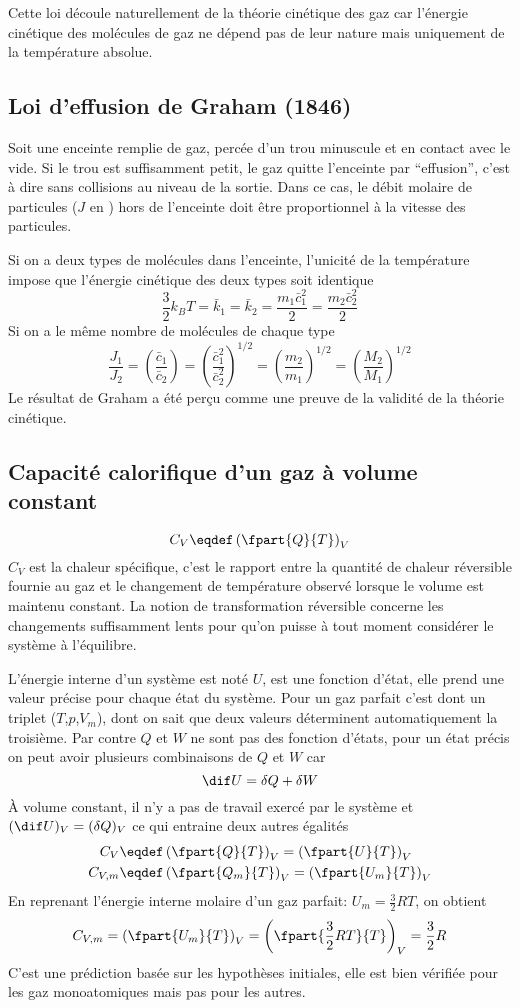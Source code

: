 Cette loi découle naturellement de la théorie cinétique des gaz car
l'énergie cinétique des molécules de gaz ne dépend pas de leur nature mais
uniquement de la température absolue.

\subsection{Loi d'effusion de Graham (1846)}
Soit une enceinte remplie de gaz, percée d'un trou minuscule et
en contact avec le vide.
Si le trou est suffisamment petit,
le gaz quitte l'enceinte par ``effusion'',
c'est à dire sans collisions au niveau de la sortie.
Dans ce cas, le débit molaire de particules ($J$ en \mole\per\second)
hors de l'enceinte doit être proportionnel à la vitesse des particules.

Si on a deux types de molécules dans l'enceinte,
l'unicité de la température impose que
l'énergie cinétique des deux types soit identique
\[ \frac 32 k_BT = \bar k_1 = \bar k_2 = \frac{m_1\bar c_1^2}{2} =
\frac{m_2\bar c_2^2}{2} \]
Si on a le même nombre de molécules de chaque type
\[ \frac{J_1}{J_2} = \left(\frac{\bar c_1}{\bar c_2}\right) =
\left(\frac{\bar c_1^2}{\bar c_2^2}\right)^{1/2} =
\left(\frac{m_2}{m_1}\right)^{1/2} =
\left(\frac{M_2}{M_1}\right)^{1/2} \]
Le résultat de Graham a été perçu comme
une preuve de la validité de la théorie cinétique.

\subsection{Capacité calorifique d'un gaz à volume constant}
\[ C_V \eqdef \left(\fpart{Q}{T} \right)_V \]
$C_V$ est la chaleur spécifique,
c'est le rapport entre la quantité de chaleur réversible fournie au gaz et
le changement de température observé lorsque le volume est maintenu constant.
La notion de transformation réversible concerne les changements suffisamment
lents pour qu'on puisse à tout moment considérer le système à l'équilibre.

L'énergie interne d'un système est noté $U$, est une fonction d'état,
elle prend une valeur précise pour chaque état du système.
Pour un gaz parfait c'est dont un triplet ($T$,$p$,$V_m$),
dont on sait que deux valeurs déterminent automatiquement la troisième.
Par contre $Q$ et $W$ ne sont pas des fonction d'états,
pour un état précis on peut avoir plusieurs combinaisons de $Q$ et $W$ car
\[ \dif U = \delta Q + \delta W \]
À volume constant, il n'y a pas de travail exercé par le système et
$(\dif U)_V = (\delta Q)_V$ ce qui entraine deux autres égalités
\begin{align*}
  C_V & \eqdef \left(\fpart{Q}{T}\right)_V =
  \left(\fpart{U}{T}\right)_V\\
  C_{V,m} & \eqdef \left(\fpart{Q_m}{T}\right)_V =
  \left(\fpart{U_m}{T}\right)_V
\end{align*}
En reprenant l'énergie interne molaire d'un gaz parfait:
$U_m = \frac 32 RT$, on obtient
\[ C_{V,m} = \left(\fpart{U_m}{T}\right)_V =
\left(\fpart{\frac 32 RT}{T}\right)_V = \frac 32R \]
C'est une prédiction basée sur les hypothèses initiales,
elle est bien vérifiée pour les gaz monoatomiques mais pas pour les autres.

